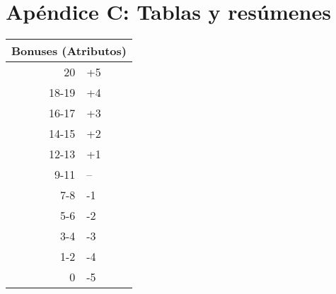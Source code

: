 \chapter{Apéndice C: Tablas y resúmenes}

\begin{tabular}{ |r|l| }
  \hline
  \multicolumn{2}{|c|}{Bonuses (Atributos)} \\
  \hline
  20 & +5 \\
  18-19 & +4 \\
  16-17 & +3 \\
  14-15 & +2 \\
  12-13 & +1 \\
  9-11 & -- \\
  7-8 & -1 \\
  5-6 & -2 \\
  3-4 & -3 \\
  1-2 & -4 \\
  0 & -5 \\
  \hline
\end{tabular}